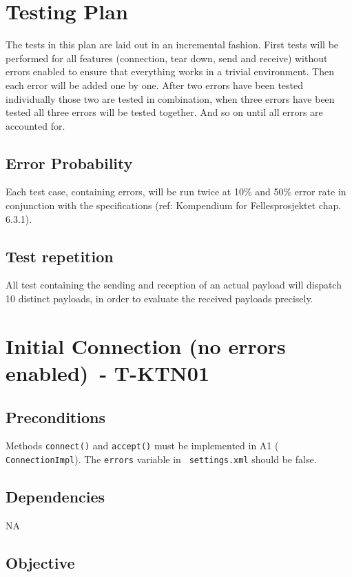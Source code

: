 \documentclass{article}
\begin{document}
\section{Testing Plan}

The tests in this plan are laid out in an incremental fashion. First tests
will be performed for all features (connection, tear down, send and receive)
without errors enabled to ensure that everything works in a trivial
environment. Then each error will be added one by one. After two errors have
been tested individually those two are tested in combination, when three
errors have been tested all three errors will be tested together. And so on
until all errors are accounted for.

\subsection{Error Probability}

Each test case, containing errors, will be run twice at 10\% and 50\% error
rate in conjunction with the specifications (ref: Kompendium for
Fellesprosjektet chap. 6.3.1).

\subsection{Test repetition}

All test containing the sending and reception of an actual payload will
dispatch 10 distinct payloads, in order to evaluate the received payloads
precisely.

\section{Initial Connection (no errors enabled)\ - T-KTN01}

\subsection{Preconditions}

Methods \texttt{connect()} and \texttt{accept()} must be implemented in A1 (%
\texttt{ConnectionImpl}). The \texttt{errors} variable in \texttt{%
settings.xml} should be false.

\subsection{Dependencies}

NA

\subsection{Objective}
\end{document}
